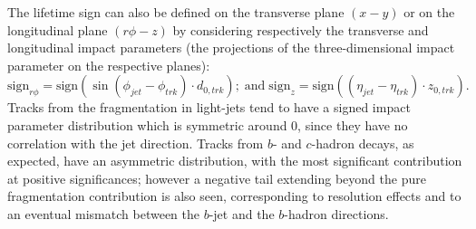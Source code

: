 The lifetime sign can also be defined on the transverse plane $(x-y)$ or on the longitudinal plane $(r\phi-z)$ by considering respectively the transverse and longitudinal impact parameters (the projections of the three-dimensional impact parameter on the respective planes):
%
\begin{equation}
\mbox{sign}_{r\phi} = \mbox{sign}(\sin(\phi_{jet} - \phi_{trk})\cdot d_{0,trk}); \; \mbox{and} \; \mbox{sign}_{z} = \mbox{sign}((\eta_{jet} - \eta_{trk})\cdot z_{0,trk}).
\end{equation}
%
Tracks from the fragmentation in light-jets tend to have a signed impact parameter distribution which is symmetric around 0, since they have no correlation with the jet direction. Tracks from $b$- and $c$-hadron decays, as expected, have an asymmetric distribution, with the most significant contribution at positive significances; however a negative tail extending beyond the pure fragmentation contribution is also seen, corresponding to resolution effects and to an eventual mismatch between the $b$-jet and the $b$-hadron directions.



